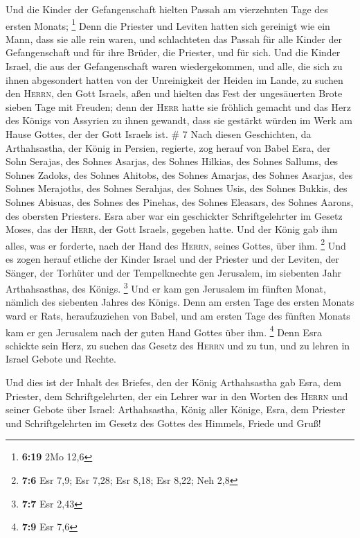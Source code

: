  Und die Kinder der Gefangenschaft hielten Passah am
vierzehnten Tage des ersten Monats; \footnote{\textbf{6:19} 2Mo 12,6}
 Denn die Priester und Leviten hatten sich gereinigt wie
ein Mann, dass sie alle rein waren, und schlachteten das Passah für alle
Kinder der Gefangenschaft und für ihre Brüder, die Priester, und für
sich.  Und die Kinder Israel, die aus der Gefangenschaft
waren wiedergekommen, und alle, die sich zu ihnen abgesondert hatten von
der Unreinigkeit der Heiden im Lande, zu suchen den \textsc{Herrn}, den
Gott Israels, aßen  und hielten das Fest der ungesäuerten
Brote sieben Tage mit Freuden; denn der \textsc{Herr} hatte sie fröhlich
gemacht und das Herz des Königs von Assyrien zu ihnen gewandt, dass sie
gestärkt würden im Werk am Hause Gottes, der der Gott Israels ist. \# 7
 Nach diesen Geschichten, da Arthahsastha, der König in
Persien, regierte, zog herauf von Babel Esra, der Sohn Serajas, des
Sohnes Asarjas, des Sohnes Hilkias,  des Sohnes Sallums,
des Sohnes Zadoks, des Sohnes Ahitobs,  des Sohnes
Amarjas, des Sohnes Asarjas, des Sohnes Merajoths,  des
Sohnes Serahjas, des Sohnes Usis, des Sohnes Bukkis,  des
Sohnes Abisuas, des Sohnes des Pinehas, des Sohnes Eleasars, des Sohnes
Aarons, des obersten Priesters.  Esra aber war ein
geschickter Schriftgelehrter im Gesetz Moses, das der \textsc{Herr}, der
Gott Israels, gegeben hatte. Und der König gab ihm alles, was er
forderte, nach der Hand des \textsc{Herrn}, seines Gottes, über ihm.
\footnote{\textbf{7:6} Esr 7,9; Esr 7,28; Esr 8,18; Esr 8,22; Neh 2,8}
 Und es zogen herauf etliche der Kinder Israel und der
Priester und der Leviten, der Sänger, der Torhüter und der Tempelknechte
gen Jerusalem, im siebenten Jahr Arthahsasthas, des Königs. \footnote{\textbf{7:7}
  Esr 2,43}  Und er kam gen Jerusalem im fünften Monat,
nämlich des siebenten Jahres des Königs.  Denn am ersten
Tage des ersten Monats ward er Rats, heraufzuziehen von Babel, und am
ersten Tage des fünften Monats kam er gen Jerusalem nach der guten Hand
Gottes über ihm. \footnote{\textbf{7:9} Esr 7,6}  Denn
Esra schickte sein Herz, zu suchen das Gesetz des \textsc{Herrn} und zu
tun, und zu lehren in Israel Gebote und Rechte.

 Und dies ist der Inhalt des Briefes, den der König
Arthahsastha gab Esra, dem Priester, dem Schriftgelehrten, der ein
Lehrer war in den Worten des \textsc{Herrn} und seiner Gebote über
Israel:  Arthahsastha, König aller Könige, Esra, dem
Priester und Schriftgelehrten im Gesetz des Gottes des Himmels, Friede
und Gruß!

